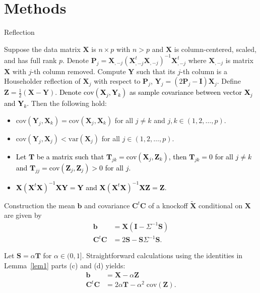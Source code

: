 \documentclass[]{beamer}
\def\tcb{\textcolor{black}}
\def\T{{\mathbf{T}}}
\def\tX{{\mathbf{\tilde{X}}}}
\def\X{{\mathbf{X}}}
\def\Y{{\mathbf{Y}}}
\def\C{{\mathbf{C}}}
\def\b{{\mathbf{b}}}
\def\Z{{\mathbf{Z}}}
\def\S{{\mathbf{S}}}
\def\I{{\mathbf{I}}}
\def\P{{\mathbf{P}}}
\def\cov{{\textrm{cov}}}
\def\var{{\textrm{var}}}
\begin{document}
\section{Methods}
\begin{frame}{Reflection}
\begin{lemma}\label{lem1}
Suppose the data matrix $\X$ is $n \times p$ with $n > p$ and $\X$ is column-centered, scaled, and has full rank $p$. 
Denote $\P_j = \X_{,-j} (\X_{,-j}^t  \X_{,-j} )^{-1}  \X_{,-j}^t $ where $\X_{,-j}$ is matrix $\X$ with $j$-th column removed. 
Compute $\Y$ such that its $j$-th column is a Householder reflection of $\X_j$ with respect to $\P_j$, $\Y_j = (2 \P_j - \I)  \X_j$. 
Define $\Z = \frac{1}{2}(\X -\Y)$. 
\tcb{Denote $\cov(\X_j, \Y_k)$ as sample covariance between vector $\X_j$ and $\Y_k$. }
Then the following hold: 
\begin{itemize}
 \item[a)] $\cov(\Y_j, \X_k) = \cov(\X_j, \X_k)$ for all $j \neq k$ and $j,k \in (1,2,\dots, p)$. 
 \item[b)] $\cov(\Y_j, \X_j) < \var(\X_j)$ for all $j \in (1,2,\dots, p)$. 
 \item[c)] \tcb{Let $\T$ be a matrix such that $\T_{jk} = \cov(\X_j, \Z_k)$, then $\T_{jk} = 0$ for all $j\ne k$ and $\T_{jj} = \cov(\Z_j, \Z_j) > 0$ for all $j$.}     
 \item[d)] \tcb{$\X(\X^t\X)^{-1}\X \Y = \Y$ and $\X(\X^t\X)^{-1}\X \Z = \Z$.} 
 \end{itemize}
\end{lemma}
\end{frame}



\begin{frame}{Construction}
the mean $\b$ and covariance $\C^t\C$ of a knockoff $\tX$ conditional on $\X$ are given by   
\begin{equation}
\begin{aligned}
\b &= \X (\I - \Sigma^{-1} \S) \\
 \C^t \C &= 2\S - \S \Sigma^{-1} \S.
\end{aligned}
\end{equation}

Let $\S = \alpha \T$ for $\alpha\in(0,1]$. Straightforward calculations using the identities in Lemma~\ref{lem1} parts (c) and (d) yields: 
\begin{equation} \label{ctc}
\begin{aligned}
 \b  & = \X - \alpha \Z \\ 
\C^t \C    &=  2 \alpha \T - \alpha^2 \; \cov(\Z).                      
\end{aligned}
\end{equation}


\end{frame}
\end{document}
